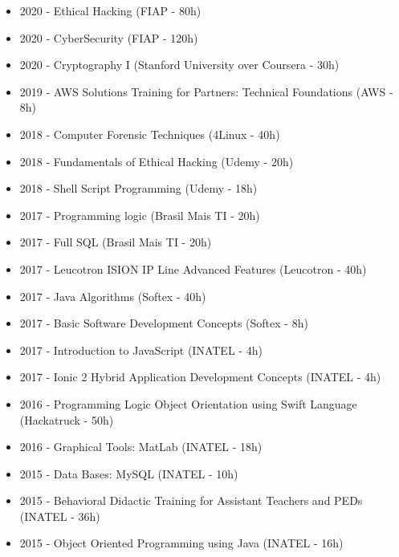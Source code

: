 \documentclass[10pt,a4paper,ragged2e, normalphoto]{altacv}
\begin{document}
\begin{fullwidth}

\begin{itemize}
    \item 2020 - Ethical Hacking (FIAP - 80h)
    \item 2020 - CyberSecurity (FIAP - 120h)
    \item 2020 - Cryptography I (Stanford University over Coursera - 30h)
    \item 2019 - AWS Solutions Training for Partners: Technical Foundations (AWS - 8h)
    \item 2018 - Computer Forensic Techniques (4Linux - 40h)
    \item 2018 - Fundamentals of Ethical Hacking (Udemy - 20h)
    \item 2018 - Shell Script Programming (Udemy - 18h)
    \item 2017 - Programming logic (Brasil Mais TI - 20h)
    \item 2017 - Full SQL (Brasil Mais TI - 20h)
    \item 2017 - Leucotron ISION IP Line Advanced Features (Leucotron - 40h)
    \item 2017 - Java Algorithms (Softex - 40h)
    \item 2017 - Basic Software Development Concepts (Softex - 8h)
    \item 2017 - Introduction to JavaScript (INATEL - 4h)
    \item 2017 - Ionic 2 Hybrid Application Development Concepts (INATEL - 4h)
    \item 2016 - Programming Logic Object Orientation using Swift Language (Hackatruck - 50h)
    \item 2016 - Graphical Tools: MatLab (INATEL - 18h)
    \item 2015 - Data Bases: MySQL (INATEL - 10h)
    \item 2015 - Behavioral Didactic Training for Assistant Teachers and PEDs (INATEL - 36h)
    \item 2015 - Object Oriented Programming using Java (INATEL - 16h)
\end{itemize}

\end{fullwidth}
\end{document}
